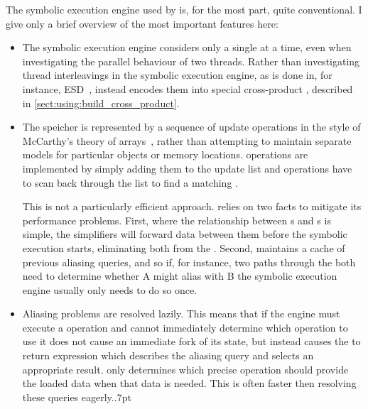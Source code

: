 The symbolic execution engine used by {\implementation} is, for the
most part, quite conventional.  I give only a brief overview of the
most important features here:
\begin{itemize}
\item The symbolic execution engine considers only a single
  {\StateMachine} at a time, even when investigating the parallel
  behaviour of two threads.  Rather than investigating thread
  interleavings in the symbolic execution engine, as is done in, for
  instance, ESD~\cite{Zamfir2010}, {\technique} instead encodes them
  into special cross-product {\StateMachines}, described in
  \autoref{sect:using:build_cross_product}.

\item The {\StateMachine} speicher is represented by a sequence of
  update operations in the style of McCarthy's theory of
  arrays~\cite{McCarthy1962}, rather than attempting to maintain
  separate models for particular objects or memory locations.
   operations are implemented by simply adding them to
  the update list and  operations have to scan back
  through the list to find a matching .

  This is not a particularly efficient approach.  {\Implementation}
  relies on two facts to mitigate its performance problems.  First,
  where the relationship between s and s is
  simple, the {\StateMachine} simplifiers will forward data between
  them before the symbolic execution starts, eliminating both from the
  {\StateMachine}.  Second, {\implementation} maintains a cache of
  previous aliasing queries, and so if, for instance, two paths
  through the {\StateMachine} both need to determine whether
   A might alias with  B the symbolic
  execution engine usually only needs to do so once.

\item Aliasing problems are resolved lazily.  This means that if the
  engine must execute a  operation and cannot immediately
  determine which  operation to use it does not cause an
  immediate fork of its state, but instead causes the  to
  return {\AStateMachine} expression which describes the aliasing
  query and selects an appropriate result.  {\Implementation} only
  determines which precise  operation should provide the
  loaded data when that data is needed.  This is often faster then
  resolving these queries eagerly.\kern.7pt


\end{itemize}
